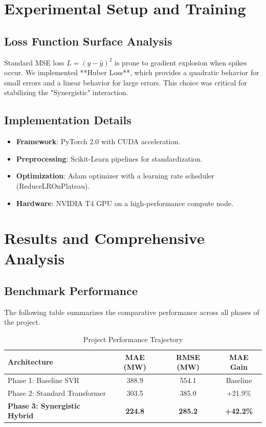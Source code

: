 \documentclass[conference]{IEEEtran}
\begin{document}
\section{Experimental Setup and Training}
\subsection{Loss Function Surface Analysis}
Standard MSE loss $L = (y - \hat{y})^2$ is prone to gradient explosion when spikes occur. We implemented **Huber Loss**, which provides a quadratic behavior for small errors and a linear behavior for large errors. This choice was critical for stabilizing the "Synergistic" interaction.

\subsection{Implementation Details}
\begin{itemize}
    \item \textbf{Framework}: PyTorch 2.0 with CUDA acceleration.
    \item \textbf{Preprocessing}: Scikit-Learn pipelines for standardization.
    \item \textbf{Optimization}: Adam optimizer with a learning rate scheduler (ReduceLROnPlateau).
    \item \textbf{Hardware}: NVIDIA T4 GPU on a high-performance compute node.
\end{itemize}

\section{Results and Comprehensive Analysis}
\subsection{Benchmark Performance}
The following table summarizes the comparative performance across all phases of the project.

\begin{table}[htbp]
\centering
\caption{Project Performance Trajectory}
\begin{tabular}{>{\raggedright\arraybackslash}p{3cm}ccc}
\toprule
\textbf{Architecture} & \textbf{MAE (MW)} & \textbf{RMSE (MW)} & \textbf{MAE Gain} \\ \midrule
Phase 1: Baseline SVR  & 388.9             & 554.1              & Baseline          \\
Phase 2: Standard Transformer & 303.5             & 385.0              & +21.9\%           \\
\textbf{Phase 3: Synergistic Hybrid} & \textbf{224.8}    & \textbf{285.2}     & \textbf{+42.2\%}  \\ \bottomrule
\end{tabular}
\end{table}
\end{document}
